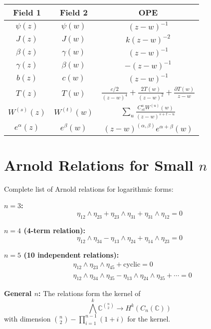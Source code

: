 \begin{center}
\begin{tabular}{|c|c|c|}
\hline
Field 1 & Field 2 & OPE \\
\hline
$\psi(z)$ & $\psi(w)$ & $(z-w)^{-1}$ \\
$J(z)$ & $J(w)$ & $k(z-w)^{-2}$ \\
$\beta(z)$ & $\gamma(w)$ & $(z-w)^{-1}$ \\
$\gamma(z)$ & $\beta(w)$ & $-(z-w)^{-1}$ \\
$b(z)$ & $c(w)$ & $(z-w)^{-1}$ \\
$T(z)$ & $T(w)$ & $\frac{c/2}{(z-w)^4} + \frac{2T(w)}{(z-w)^2} + \frac{\partial T(w)}{z-w}$ \\
$W^{(s)}(z)$ & $W^{(t)}(w)$ & $\sum_u \frac{C^u_{st} W^{(u)}(w)}{(z-w)^{s+t-u}}$ \\
$e^\alpha(z)$ & $e^\beta(w)$ & $(z-w)^{(\alpha,\beta)} e^{\alpha+\beta}(w)$ \\
\hline
\end{tabular}
\end{center}
 
\chapter{Arnold Relations for Small $n$}
 
Complete list of Arnold relations for logarithmic forms:
 
\textbf{$n = 3$:}
\[
\eta_{12} \wedge \eta_{23} + \eta_{23} \wedge \eta_{31} + \eta_{31} \wedge \eta_{12} = 0
\]
 
\textbf{$n = 4$ (4-term relation):}
\[
\eta_{12} \wedge \eta_{34} - \eta_{13} \wedge \eta_{24} + \eta_{14} \wedge \eta_{23} = 0
\]
 
\textbf{$n = 5$ (10 independent relations):}
\begin{align}
&\eta_{12} \wedge \eta_{23} \wedge \eta_{45} + \text{cyclic} = 0 \\
&\eta_{12} \wedge \eta_{34} \wedge \eta_{35} - \eta_{13} \wedge \eta_{24} \wedge \eta_{35} + \cdots = 0
\end{align}
 
\textbf{General $n$:} The relations form the kernel of
\[
\bigwedge^k \mathbb{C}^{\binom{n}{2}} \to H^k(C_n(\mathbb{C}))
\]
with dimension $\binom{n}{2} - \prod_{i=1}^{n-1}(1 + i)$ for the kernel. 
